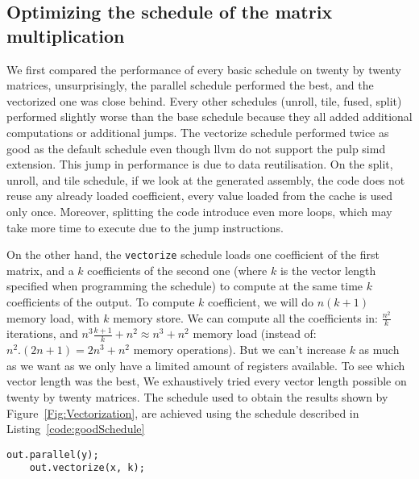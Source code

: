 \subsection{Optimizing the schedule of the matrix multiplication}
\label{sec:optimization}
    We first compared the performance of every basic schedule on twenty by twenty matrices, unsurprisingly,  the parallel schedule performed the best, and the vectorized one was close behind.
    Every other schedules (unroll, tile, fused, split) performed slightly worse than the base schedule because they all added additional computations or additional jumps.
    The vectorize schedule performed twice as good as the default schedule even though \gls{llvm} do not support the \gls{pulp} \gls{simd} extension.
    This jump in performance is due to data reutilisation.
    On the split, unroll, and tile schedule, if we look at the generated assembly, the code does not reuse any already loaded coefficient, every value loaded from the cache is used only once.
    Moreover, splitting the code introduce even more loops, which may take more time to execute due to the jump instructions.

    On the other hand, the \texttt{vectorize} schedule loads one coefficient of the first matrix, and a $k$ coefficients of the second one (where $k$ is the vector length specified when programming the schedule) to compute at the same time $k$ coefficients of the output.
    To compute $k$ coefficient, we will do $n(k+1)$ memory load, with $k$ memory store.
    We can compute all the coefficients in: $\frac{n^2}{k}$ iterations, and $n^3\frac{k+1}{k} + n^2 \approx n^3 + n^2$ memory load (instead of: $n^2.(2n+1)=2n^3 + n^2$ memory operations).
    But we can't increase $k$ as much as we want as we only have a limited amount of registers available.
    To see which vector length was the best, We exhaustively tried every vector length possible on twenty by twenty matrices. The schedule used to obtain the results shown by Figure~\ref{Fig:Vectorization}, are achieved using the schedule described in Listing~\ref{code:goodSchedule}

\lstset{basicstyle=\ttfamily\footnotesize,breaklines=true,tabsize=2}

\begin{lstlisting}[caption={Schedule using Parallel and Vectorize}, captionpos=b, label={code:goodSchedule}]
    out.parallel(y);
    out.vectorize(x, k);

\end{lstlisting}

